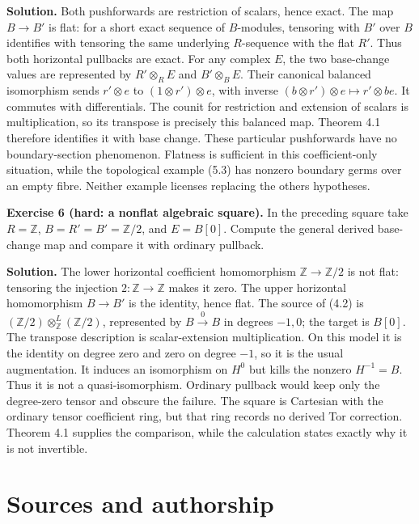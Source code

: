 \documentclass[
  english,
  11pt,
  a4paper,
]{article}
\begin{document}
\textbf{Solution.} Both pushforwards are restriction of scalars, hence
exact. The map \(B\to B'\) is flat: for a short exact sequence of
\(B\)-modules, tensoring with \(B'\) over \(B\) identifies with
tensoring the same underlying \(R\)-sequence with the flat \(R'\). Thus
both horizontal pullbacks are exact. For any complex \(E\), the two
base-change values are represented by \(R'\otimes_RE\) and
\(B'\otimes_BE\). Their canonical balanced isomorphism sends
\(r'\otimes e\) to \((1\otimes r')\otimes e\), with inverse
\((b\otimes r')\otimes e\mapsto r'\otimes be\). It commutes with
differentials. The counit for restriction and extension of scalars is
multiplication, so its transpose is precisely this balanced map. Theorem
4.1 therefore identifies it with base change. These particular
pushforwards have no boundary-section phenomenon. Flatness is sufficient
in this coefficient-only situation, while the topological example (5.3)
has nonzero boundary germs over an empty fibre. Neither example licenses
replacing the other\textquotesingle s hypotheses.

\textbf{Exercise 6 (hard: a nonflat algebraic square).} In the preceding
square take \(R=\mathbb Z\), \(B=R'=B'=\mathbb Z/2\), and \(E=B[0]\).
Compute the general derived base-change map and compare it with ordinary
pullback.

\textbf{Solution.} The lower horizontal coefficient homomorphism
\(\mathbb Z\to\mathbb Z/2\) is not flat: tensoring the injection
\(2:\mathbb Z\to\mathbb Z\) makes it zero. The upper horizontal
homomorphism \(B\to B'\) is the identity, hence flat. The source of
(4.2) is \((\mathbb Z/2)\otimes^L_{\mathbb Z}(\mathbb Z/2)\),
represented by \(B\xrightarrow0B\) in degrees \(-1,0\); the target is
\(B[0]\). The transpose description is scalar-extension multiplication.
On this model it is the identity on degree zero and zero on degree
\(-1\), so it is the usual augmentation. It induces an isomorphism on
\(H^0\) but kills the nonzero \(H^{-1}=B\). Thus it is not a
quasi-isomorphism. Ordinary pullback would keep only the degree-zero
tensor and obscure the failure. The square is Cartesian with the
ordinary tensor coefficient ring, but that ring records no derived Tor
correction. Theorem 4.1 supplies the comparison, while the calculation
states exactly why it is not invertible.

\section{Sources and authorship}\label{sources-and-authorship}
\end{document}

